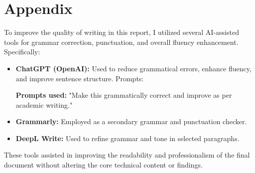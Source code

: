\documentclass[../report.tex]{subfiles}
\begin{document}
\section*{Appendix}
\label{sec:appendix}

To improve the quality of writing in this report, I utilized several AI-assisted tools for grammar correction, punctuation, and overall fluency enhancement. Specifically:

\begin{itemize}
    \item \textbf{ChatGPT (OpenAI):} Used to reduce grammatical errors, enhance fluency, and improve sentence structure. 
    Prompts:
    
    \textbf{Prompts used:} "Make this grammatically correct and improve as per academic writing."
    
    \item \textbf{Grammarly:} Employed as a secondary grammar and punctuation checker.
    
    \item \textbf{DeepL Write:} Used to refine grammar and tone in selected paragraphs.
\end{itemize}

These tools assisted in improving the readability and professionalism of the final document without altering the core technical content or findings.
\end{document}
